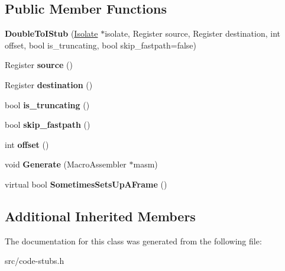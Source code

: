 \subsection*{Public Member Functions}
\begin{DoxyCompactItemize}
\item 
\hypertarget{classv8_1_1internal_1_1_double_to_i_stub_aea39032084ac79a9ee7f48ea34a993d5}{}{\bfseries Double\+To\+I\+Stub} (\hyperlink{classv8_1_1internal_1_1_isolate}{Isolate} $\ast$isolate, Register source, Register destination, int offset, bool is\+\_\+truncating, bool skip\+\_\+fastpath=false)\label{classv8_1_1internal_1_1_double_to_i_stub_aea39032084ac79a9ee7f48ea34a993d5}

\item 
\hypertarget{classv8_1_1internal_1_1_double_to_i_stub_af5b01ea1fe9efed9949cc5b407bd0a32}{}Register {\bfseries source} ()\label{classv8_1_1internal_1_1_double_to_i_stub_af5b01ea1fe9efed9949cc5b407bd0a32}

\item 
\hypertarget{classv8_1_1internal_1_1_double_to_i_stub_a16964642e29f24bbdc655e7d3abe2295}{}Register {\bfseries destination} ()\label{classv8_1_1internal_1_1_double_to_i_stub_a16964642e29f24bbdc655e7d3abe2295}

\item 
\hypertarget{classv8_1_1internal_1_1_double_to_i_stub_a2ff5292c028f603a4d0617bb946c5517}{}bool {\bfseries is\+\_\+truncating} ()\label{classv8_1_1internal_1_1_double_to_i_stub_a2ff5292c028f603a4d0617bb946c5517}

\item 
\hypertarget{classv8_1_1internal_1_1_double_to_i_stub_a24533329bfcc2dbee303157173855526}{}bool {\bfseries skip\+\_\+fastpath} ()\label{classv8_1_1internal_1_1_double_to_i_stub_a24533329bfcc2dbee303157173855526}

\item 
\hypertarget{classv8_1_1internal_1_1_double_to_i_stub_aef41c67f3e0cd8ddf707dc15eb092436}{}int {\bfseries offset} ()\label{classv8_1_1internal_1_1_double_to_i_stub_aef41c67f3e0cd8ddf707dc15eb092436}

\item 
\hypertarget{classv8_1_1internal_1_1_double_to_i_stub_acbb5b8e0111b804d10a82565dd2ae91f}{}void {\bfseries Generate} (Macro\+Assembler $\ast$masm)\label{classv8_1_1internal_1_1_double_to_i_stub_acbb5b8e0111b804d10a82565dd2ae91f}

\item 
\hypertarget{classv8_1_1internal_1_1_double_to_i_stub_abac537fe037494aba7a481e16eee6db2}{}virtual bool {\bfseries Sometimes\+Sets\+Up\+A\+Frame} ()\label{classv8_1_1internal_1_1_double_to_i_stub_abac537fe037494aba7a481e16eee6db2}

\end{DoxyCompactItemize}
\subsection*{Additional Inherited Members}


The documentation for this class was generated from the following file\+:\begin{DoxyCompactItemize}
\item 
src/code-\/stubs.\+h\end{DoxyCompactItemize}
